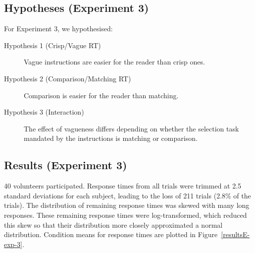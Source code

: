 \documentclass[ %
  graybox       %
 ,envcountchap  %
 ,sectrefs      %
]{svmono}
\begin{document}
\begin{table}
\centering
\caption{Experiment 3 instructions for the smallest array, arranged by condition. The instructions given in the table started with `Choose a square with \ldots'}
\label{instructionsE-exp-3}
\end{table}

\subsection{Hypotheses (Experiment 3)}

For Experiment 3, we hypothesised:

\begin{description}
	\item [Hypothesis 1 (Crisp/Vague RT)] Vague instructions are easier for the reader than crisp ones.
	\item [Hypothesis 2 (Comparison/Matching RT)] Comparison is easier for the reader than matching.
	\item [Hypothesis 3 (Interaction)] The effect of vagueness differs depending on whether the selection task mandated by the instructions is matching or comparison.
\end{description}

\subsection{Results (Experiment 3)}

40 volunteers participated. Response times from all trials were trimmed at 2.5 standard deviations for each subject, leading to the loss of 211 trials (2.8\% of the trials). The distribution of remaining response times was skewed with many long responses. These remaining response times were log-transformed, which reduced this skew so that their distribution more closely approximated a normal distribution. Condition means for response times are plotted in Figure~\ref{resultsE-exp-3}.
\end{document}
